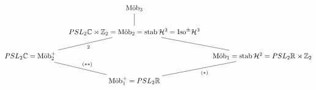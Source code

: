 $$
\begin{tikzcd}[cramped, column sep = small]
                                             & \Mob_3 \arrow[d, no head]                                                                                                               &                                                                    \\
                                             & PSL_2\mathbb C\rtimes\mathbb Z_2 = \Mob_2 = \stab\mathcal H^3 = \text{Iso}^\pm\mathcal H^3 \arrow[ld, "2", no head] \arrow[rd, no head] &                                                                    \\
PSL_2\mathbb C = \Mob_2^+ \arrow[rd, "(**)", no head] &                                                                                                                                        & \Mob_1 = \stab\mathcal H^2 = PSL_2\mathbb R\rtimes\mathbb Z_{2} \arrow[ld, "(*)", no head] \\
                                             & \Mob_1^+ = PSL_2\mathbb R                                                                                                               &                                                                   
\end{tikzcd}
$$

